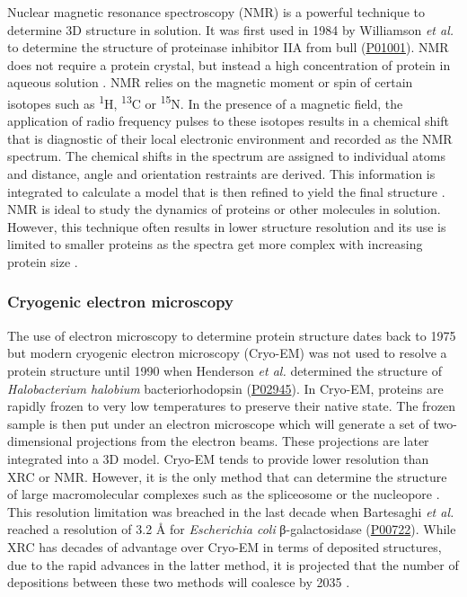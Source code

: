 Nuclear magnetic resonance spectroscopy (NMR) is a powerful technique to determine 3D structure in solution. It was first used in 1984 by Williamson \textit{et al.} \cite{WILLIAMSON_1985_NMR} to determine the structure of proteinase inhibitor IIA from bull (\href{https://www.uniprot.org/uniprotkb/P01001/entry}{P01001}). NMR does not require a protein crystal, but instead a high concentration of protein in aqueous solution \cite{WUTHRICH_1982_NMR}. NMR relies on the magnetic moment or spin of certain isotopes such as \textsuperscript{1}H, \textsuperscript{13}C or \textsuperscript{15}N. In the presence of a magnetic field, the application of radio frequency pulses to these isotopes results in a chemical shift that is diagnostic of their local electronic environment and recorded as the NMR spectrum. The chemical shifts in the spectrum are assigned to individual atoms and distance, angle and orientation restraints are derived. This information is integrated to calculate a model that is then refined to yield the final structure \cite{WUTHRICH_1984_NMR}. NMR is ideal to study the dynamics of proteins or other molecules in solution. However, this technique often results in lower structure resolution and its use is limited to smaller proteins as the spectra get more complex with increasing protein size \cite{EMWAS_2015_NMR}.

\subsubsection{Cryogenic electron microscopy}

The use of electron microscopy to determine protein structure dates back to 1975 \cite{HENDERSON_1975_EM} but modern cryogenic electron microscopy (Cryo-EM) was not used to resolve a protein structure until 1990 when Henderson \textit{et al.} \cite{HENDERSON_1990_CRYOEM} determined the structure of \textit{Halobacterium halobium} bacteriorhodopsin (\href{https://www.uniprot.org/uniprotkb/P02945/entry}{P02945}). In Cryo-EM, proteins are rapidly frozen to very low temperatures to preserve their native state. The frozen sample is then put under an electron microscope which will generate a set of two-dimensional projections from the electron beams. These projections are later integrated into a 3D model. Cryo-EM tends to provide lower resolution than XRC or NMR. However, it is the only method that can determine the structure of large macromolecular complexes such as the spliceosome \cite{CHUANGYE_2016_SPLICEOSOME} or the nucleopore \cite{KOSINSKI_2016_NUCLEOPORE}. This resolution limitation was breached in the last decade when Bartesaghi \textit{et al.} \cite{BARTESAGHI_2014_CRYOEM} reached a resolution of 3.2 \AA{} for \textit{Escherichia coli} β-galactosidase (\href{https://www.uniprot.org/uniprotkb/P00722/entry}{P00722}). While XRC has decades of advantage over Cryo-EM in terms of deposited structures, due to the rapid advances in the latter method, it is projected that the number of depositions between these two methods will coalesce by 2035 \cite{CHIU_2021_CRYOEM}.

